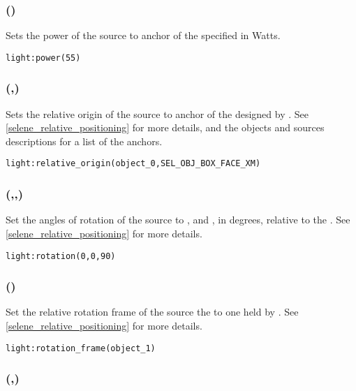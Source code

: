 \subsubsection[power]{()}

Sets the power of the source to anchor of the specified  in Watts.
\begin{lstlisting}
light:power(55)
\end{lstlisting}

\subsubsection[relative\_origin]{(,)}

Sets the relative origin of the source to anchor of the  designed by . See \ref{selene_relative_positioning} for more details, and the objects and sources descriptions for a list of the anchors.
\begin{lstlisting}
light:relative_origin(object_0,SEL_OBJ_BOX_FACE_XM)
\end{lstlisting}

\subsubsection[rotation]{(\lft{$\alpha$},\lft{$\beta$},\lft{$\gamma$})}

Set the angles of rotation of the source to \lft{$\alpha$}, \lft{$\beta$} and \lft{$\gamma$}, in degrees, relative to the . See \ref{selene_relative_positioning} for more details.
\begin{lstlisting}
light:rotation(0,0,90)
\end{lstlisting}

\subsubsection[rotation\_frame]{()}

Set the relative rotation frame of the source the to one held by . See \ref{selene_relative_positioning} for more details.
\begin{lstlisting}
light:rotation_frame(object_1)
\end{lstlisting}

\subsubsection[spectrum]{(,)}

